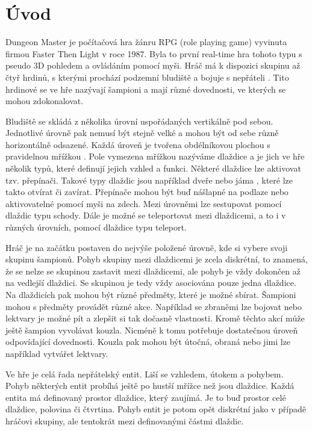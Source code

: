 \chapter{Úvod}

Dungeon Master je počítačová hra žánru RPG (role playing game) vyvinuta firmou Faster Then Light v roce 1987.
Byla to první real-time hra tohoto typu s pseudo 3D pohledem a ovládáním pomocí myši. Hráč má k dispozici skupinu až čtyř hrdinů,
s kterými prochází podzemní bludiště a bojuje s nepřáteli . Tito hrdinové se ve hře nazývají šampioni a
mají různé dovednosti, ve kterých se mohou zdokonalovat.


Bludiště se skládá z několika úrovní uspořádaných vertikálně pod sebou. 
Jednotlivé úrovně pak nemusí být stejně velké a mohou být od sebe různě horizontálně odsazené.
Každá úroveň je tvořena obdélníkovou plochou s pravidelnou mřížkou . Pole vymezena mřížkou nazýváme dlaždice a je jich 
ve hře několik typů, které definují jejich vzhled a funkci. Některé dlaždice lze aktivovat tzv. přepínači. Takové typy dlaždic
jsou například dveře nebo jáma , které lze takto otvírat či zavírat. Přepínače mohou být buď nášlapné na podlaze nebo aktivovatelné
pomocí myši na zdech. Mezi úrovněmi lze sestupovat pomocí dlaždic typu schody.  Dále je možné se teleportovat mezi dlaždicemi, a to i v různých úrovních, pomocí dlaždice
typu teleport. 


Hráč je na začátku postaven do nejvýše položené úrovně, kde si vybere svoji skupinu šampionů. 
Pohyb skupiny mezi dlaždicemi je zcela diskrétní, to znamená, že se nelze se skupinou zastavit mezi dlaždicemi, ale pohyb je vždy dokončen
až na vedlejší dlaždici. Se skupinou je tedy vždy asociována pouze jedna dlaždice. Na dlaždicích pak mohou
být různé předměty, které je možné sbírat. Šampioni mohou s předměty provádět různé akce.
Například se zbraněmi lze bojovat nebo lektvary je možné pít a zlepšit si tak dočasně vlastnosti. Kromě těchto 
akcí může ještě šampion vyvolávat kouzla. Nicméně k tomu potřebuje dostatečnou úroveň odpovídající dovednosti.
Kouzla pak mohou být útočná, obraná nebo jimi lze například vytvářet lektvary.

Ve hře je celá řada nepřátelský entit. Liší se vzhledem, útokem a pohybem. Pohyb některých entit 
probíhá ještě po hustší mřížce než jsou dlaždice. Každá entita má definovaný prostor dlaždice, který zaujímá. Je to buď prostor
celé dlaždice, polovina či čtvrtina.  Pohyb entit je potom opět diskrétní jako v případě hráčovi skupiny, 
ale tentokrát mezi definovanými částmi dlaždic. 

